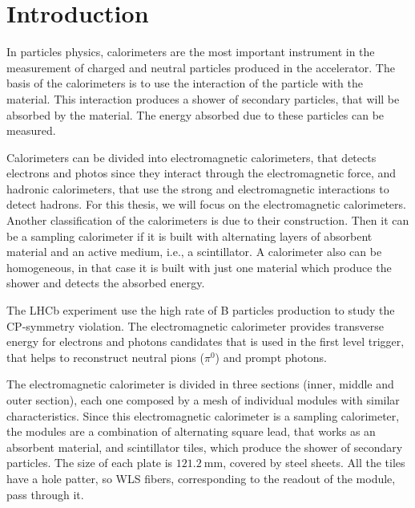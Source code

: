 \chapter{Introduction}
In particles physics, calorimeters are the most important instrument in the
measurement of charged and neutral particles produced in the
accelerator\cite{zhu2003calorimetry}. The basis of the calorimeters is to use
the interaction of the particle with the material. This interaction produces a
shower of secondary particles, that will be absorbed by the material. The
energy absorbed due to these particles can be
measured\cite{fabjan2003calorimetry}.

Calorimeters can be divided into electromagnetic calorimeters, that detects
electrons and photos since they interact through the electromagnetic force, and
hadronic calorimeters, that use the strong and electromagnetic interactions to
detect hadrons\cite{fabjan2003calorimetry}. For this thesis, we will focus on
the electromagnetic calorimeters. Another classification of the calorimeters is
due to their construction. Then it can be a sampling calorimeter if it is built
with alternating layers of absorbent material and an active medium, i.e., a
scintillator. A calorimeter also can be homogeneous, in that case it is built
with just one material which produce the shower and detects the absorbed
energy\cite{fabjan2003calorimetry}.

The LHCb experiment use the high rate of B particles production to study the
CP-symmetry violation\cite{omelaenko2000lhcb, Collaboration_2008}. The
electromagnetic calorimeter provides transverse energy for electrons and
photons candidates that is used in the first level
trigger\cite{Antunes-Nobrega:630828}, that helps to reconstruct neutral pions
(\(\pi^0\)) and prompt photons.

The electromagnetic calorimeter is divided in three sections (inner, middle and
outer section)\cite{omelaenko2000lhcb}, each one composed by a mesh of
individual modules with similar characteristics. Since this electromagnetic
calorimeter is a sampling calorimeter, the modules are a combination of
alternating square lead, that works as an absorbent
material\cite{omelaenko2000lhcb}, and scintillator tiles, which produce the
shower of secondary particles. The size of each plate is
\(\SI{121.2}{\milli\metre}\), covered by steel sheets. All the tiles have a
hole patter, so WLS fibers, corresponding to the readout of the module, pass
through it\cite{omelaenko2000lhcb, Machikhiliyan_2009, Collaboration_2008}.

